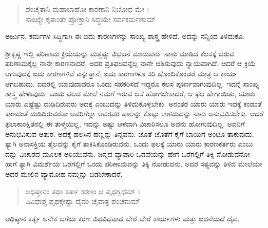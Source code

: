 \begin{verse}
ಪಂಚೈತಾನಿ ಮಹಾಬಾಹೋ ಕಾರಣಾನಿ ನಿಬೋಧ ಮೇ ।\\ಸಾಂಖ್ಯೇ ಕೃತಾಂತೇ ಪ್ರೋಕ್ತಾನಿ ಸಿದ್ಧಯೇ ಸರ್ವಕರ್ಮಣಾಮ್ 
\end{verse}

{\small ಅರ್ಜುನ, ಕರ್ಮಗಳ ಸಿದ್ಧಿಗಾಗಿ ಈ ಐದು ಕಾರಣಗಳನ್ನು ಸಾಂಖ್ಯ ಶಾಸ್ತ್ರ ಹೇಳಿದೆ. ಅದನ್ನು ನನ್ನಿಂದ ತಿಳಿದುಕೊ.}

ಶ್ರೀಕೃಷ್ಣ ಇಲ್ಲಿ ಪರಿಣಾಮ ಕ್ರಿಯೆಯನ್ನು ಮತ್ತಷ್ಚು ವಿಭಜನೆ ಮಾಡುವನು. ನಾನು ಮಾಡಿದ ಕೆಲಸಕ್ಕೆ ಬರುವ ಪರಿಣಾಮಕ್ಕೆಲ್ಲ ನಾನೇ ಕಾರಣನಾದರೆ, ಅದರ ಪ್ರತಿಫಲವನ್ನೆಲ್ಲ ನಾನೇ ಆಶಿಸುವುದು ನ್ಯಾಯವಾಗಿದೆ. ಆದರೆ ಆ ಕ್ರಿಯೆ ಆಗುವುದಕ್ಕೆ ಐದು ಕಾರಣಗಳಿವೆ ಎನ್ನುತ್ತಾನೆ. ಐದು ಕಾರಣಗಳೂ ಸರಿ ಹೊಂದಿಕೊಂಡರೆ ಮಾತ್ರ ಆ ಕಾರ್ಯ ಆಗಬಹುದು. ಐದರಲ್ಲಿ ಯಾವುದಾದರೂ ಒಂದು ಸಹಕರಿಸದೆ ಇದ್ದರೂ ಕೆಲಸ ಪೂರ್ಣವಾಗುವುದಿಲ್ಲ. ಇದನ್ನೆ ಸಾಂಖ್ಯ ಶಾಸ್ತ್ರ ಹೇಳುವುದು. ಒಂದು ಫಲದ ಮೇಲೆ ನಮಗೆ ಇರುವ ಆಸೆ ಹೋಗಬೇಕಾದರೆ, ಆ ಫಲ ಹೇಗಾಯಿತು, ಯಾರು ಯಾರು ಎಷ್ಟೆಷ್ಟು ದುಡಿದಿರುವರು ಅದಕ್ಕೆ ಎಂಬುದನ್ನು ತಿಳಿದುಕೊಳ್ಳಬೇಕು. ಅನಂತರ ಯಾರು ಯಾರು ಇದಕ್ಕೆ ಕಂಡಂತೆ ಕಾಣದಂತೆ ದುಡಿದಿರುವರೋ ಅವರಿಗೆಲ್ಲಾ ಅವರವರ ಪಾಲನ್ನು ಕೊಟ್ಟು ಉಳಿದುದನ್ನು ನಾನು ಅನುಭವಿಸಬೇಕು. ಆದರೆ ಫಲಾಕಾಂಕ್ಷಿತನಲ್ಲಿ ಈ ತಾಳ್ಮೆಯಿಲ್ಲ, ಇದನ್ನು ಅಷ್ಟು ಆಳವಾಗಿ ವಿಚಾರಿಸಲೂ ಅವನು ಹೋಗುವುದಿಲ್ಲ. ಅವನಿಗೆ ಅನುಭವಿಸುವ ಆತುರ. ಅದಕ್ಕೆ ಹಲಸಿನ ಹಣ್ಣನ್ನು ತಿನ್ನವನು. ಜೊತೆ ಜೊತೆಗೆ ಕೈಗೆ ಬಾಯಿಗೆ ಅಂಟೂ ತಾಕುವುದು. ತ್ಯಾಗಿ ಅನಾಸಕ್ತಿಯ ತೈಲವನ್ನು ಕೈಗೆ ತಾಕಿಸಿಕೊಂಡಿರುವನು. ಒಂದು ಫಲಕ್ಕೆ ಯಾರು ಯಾರು ಕಾರಣಕರ್ತರು ಎಂಬು ದನ್ನು ವಿಚಾರದ ಮೂಲಕ ಅರಿಯುವನು. ಚಿನ್ನದ ವ್ಯಾಪಾರಿ ಒಡವೆಯನ್ನು ಹೇಗೆ ಒರೆಗಲ್ಲಿಗೆ ತಿಕ್ಕಿ ನೋಡುವನೋ ಹಾಗೆ ತ್ಯಾಗಿ ವಿಮರ್ಶೆಯ ಒರೆಗಲ್ಲಿಗೆ ಒಂದು ಪರಿಣಾಮವನ್ನು ತಿಕ್ಕಿ ನೋಡುವನು. ಅದರ ಸತ್ಯವನ್ನು ತಿಳಿದ ಮೇಲೆಯೇ ಅದರ ಮೇಲಿನ ವ್ಯಾಮೋಹ ನಮ್ಮನ್ನು ಬಿಡಬೇಕಾದರೆ.

\begin{verse}
ಅಧಿಷ್ಠಾನಂ ತಥಾ ಕರ್ತಾ ಕರಣಂ ಚ ಪೃಥಗ್ವಿಧಮ್ ।\\ವಿವಿಧಾಶ್ಚ ಪೃಥಕ್ಚೇಷ್ಟಾ ದೈವಂ ಚೈವಾತ್ರ ಪಂಚಮಮ್ 
\end{verse}

{\small ಅಧಿಷ್ಠಾನ ಕರ್ತೃ ಅನೇಕ ಬಗೆಯ ಕರಣ ವಿಧವಿಧವಾದ ಬೇರೆ ಬೇರೆ ಕಾರ್ಯಗಳು ಮತ್ತು ಐದನೆಯದೆ ದೈವ.}

